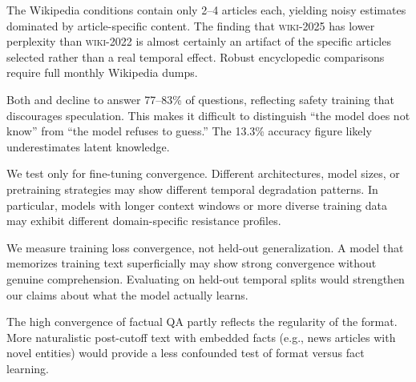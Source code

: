  The Wikipedia conditions contain only 2--4 articles each, yielding noisy estimates dominated by article-specific content. The finding that \textsc{wiki-2025} has lower perplexity than \textsc{wiki-2022} is almost certainly an artifact of the specific articles selected rather than a real temporal effect. Robust encyclopedic comparisons require full monthly Wikipedia dumps.

 Both \gptthree and \gptfourmini decline to answer 77--83\% of questions, reflecting safety training that discourages speculation. This makes it difficult to distinguish ``the model does not know'' from ``the model refuses to guess.'' The 13.3\% accuracy figure likely underestimates latent knowledge.

 We test only \mistral for fine-tuning convergence. Different architectures, model sizes, or pretraining strategies may show different temporal degradation patterns. In particular, models with longer context windows or more diverse training data may exhibit different domain-specific resistance profiles.

 We measure training loss convergence, not held-out generalization. A model that memorizes training text superficially may show strong convergence without genuine comprehension. Evaluating on held-out temporal splits would strengthen our claims about what the model actually learns.

 The high convergence of factual QA partly reflects the regularity of the \taqa format. More naturalistic post-cutoff text with embedded facts (e.g., news articles with novel entities) would provide a less confounded test of format versus fact learning.
